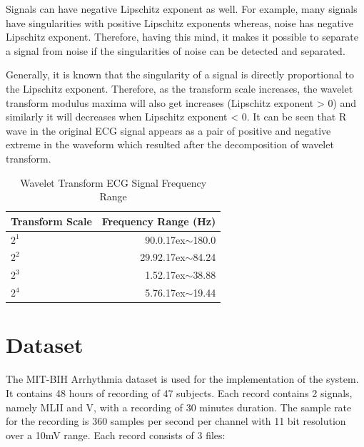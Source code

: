 Signals can have negative Lipschitz exponent as well. For example, many signals have singularities with positive Lipschitz exponents whereas, noise has negative Lipschitz exponent. Therefore, having this mind, it makes it possible to separate a signal from noise if the singularities of noise can be detected and separated.

Generally, it is known that the singularity of a signal is directly proportional to the Lipschitz exponent. Therefore, as the transform scale increases, the wavelet transform modulus maxima will also get increases (Lipschitz exponent > 0) and similarly it will decreases when Lipschitz exponent < 0. It can be seen that R wave in the original ECG signal appears as a pair of positive and negative extreme in the waveform which resulted after the decomposition of wavelet transform.


 
\renewcommand{\arraystretch}{2}
\begin{table}
	\caption{Wavelet Transform ECG Signal Frequency Range} \label{tab:sometab}
	
	\begin{center}
		\begin{tabular}{ | l | r | }
			\hline
			Transform Scale & Frequency Range (Hz) \\ \hline
			${2^1}$  & 90.0{\raise.17ex\hbox{$\scriptstyle\sim$}}180.0 \\ \hline
			${2^2}$  & 29.92{\raise.17ex\hbox{$\scriptstyle\sim$}}84.24  \\ \hline
			${2^3}$  & 1.52{\raise.17ex\hbox{$\scriptstyle\sim$}}38.88  \\ \hline
			${2^4}$  & 5.76{\raise.17ex\hbox{$\scriptstyle\sim$}}19.44  \\ 
			\hline
		\end{tabular}
	\end{center}
	
\end{table}


\section{Dataset}

The MIT-BIH Arrhythmia dataset is used for the implementation of the system. It contains 48 hours of recording of 47 subjects. Each record contains 2 signals, namely MLII and V, with a recording of 30 minutes duration. The sample rate for the recording is 360 samples per second per channel with 11 bit resolution over a 10mV range. Each record consists of 3 files:

